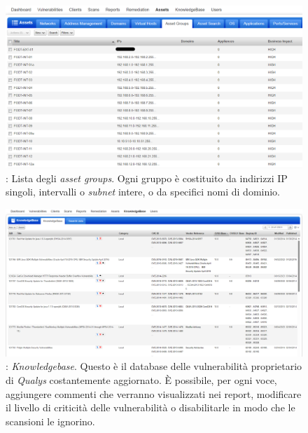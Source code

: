 \documentclass[target=bach,aauheader=]{thud}
\begin{document}
\begin{figure}[!]
    \centering
    \includegraphics[width=1\linewidth]{images/qualys_targets.png}
    \caption{: Lista degli \textit{asset groups}. Ogni gruppo è costituito da indirizzi IP singoli, intervalli o \textit{subnet} intere, o da specifici nomi di dominio.}
    \label{fig:qualys_targets}
\end{figure}

\begin{figure}
\centering
\includegraphics[scale=0.35]{images/qualys_kb.png}
    \caption{: \textit{Knowledgebase}. Questo è il database delle vulnerabilità proprietario di \textit{Qualys} costantemente aggiornato. È possibile, per ogni voce, aggiungere commenti che verranno visualizzati nei report, modificare il livello di criticità delle vulnerabilità o disabilitarle in modo che le scansioni le ignorino.}
\end{figure}


\backmatter



\end{document}
